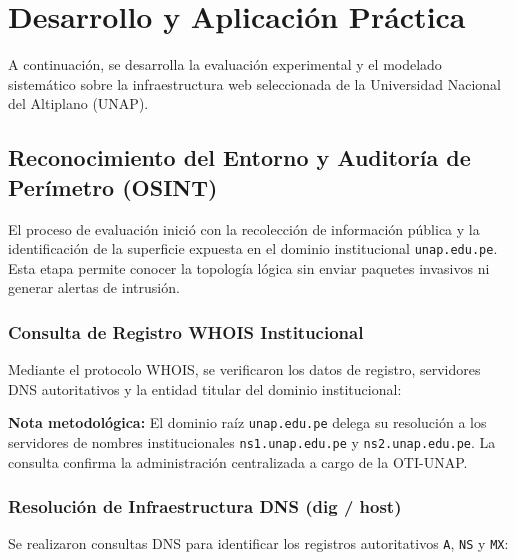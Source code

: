 \chapter{Desarrollo y Aplicación Práctica}
\label{ch:aplicacion_practica}

A continuación, se desarrolla la evaluación experimental y el modelado sistemático sobre la infraestructura web seleccionada de la Universidad Nacional del Altiplano (UNAP).

\section{Reconocimiento del Entorno y Auditoría de Perímetro (OSINT)}
El proceso de evaluación inició con la recolección de información pública y la identificación de la superficie expuesta en el dominio institucional \texttt{unap.edu.pe}. Esta etapa permite conocer la topología lógica sin enviar paquetes invasivos ni generar alertas de intrusión.

\subsection{Consulta de Registro WHOIS Institucional}
Mediante el protocolo WHOIS, se verificaron los datos de registro, servidores DNS autoritativos y la entidad titular del dominio institucional:


\begin{remark}
\textbf{Nota metodológica:} El dominio raíz \texttt{unap.edu.pe} delega su resolución a los servidores de nombres institucionales \texttt{ns1.unap.edu.pe} y \texttt{ns2.unap.edu.pe}. La consulta confirma la administración centralizada a cargo de la OTI-UNAP.
\end{remark}

\subsection{Resolución de Infraestructura DNS (dig / host)}
Se realizaron consultas DNS para identificar los registros autoritativos \texttt{A}, \texttt{NS} y \texttt{MX}:

